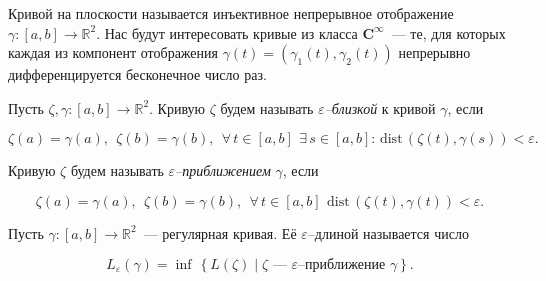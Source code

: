 
\def\dist{\mathrm{dist}\,} \def\ve{\varepsilon}

\noindent Кривой на плоскости называется инъективное непрерывное отображение $\gamma \colon [a,b] \rightarrow {\mathbb R}^2$. Нас будут интересовать кривые из класса $\mathbf C^\infty$~--- те, для которых каждая из компонент отображения $\gamma(t) = (\gamma_1 (t), \gamma_2 (t))$ непрерывно дифференцируется бесконечное число раз.

\medskip\par\noindent Пусть $\zeta, \gamma \colon [a,b] \longrightarrow {\mathbb R}^2$. Кривую $\zeta$ будем называть {\it $\varepsilon$--близкой} к кривой $\gamma$, если

\vspace{-0.2cm}
$$ \zeta(a) = \gamma(a),\ \ \zeta(b) = \gamma(b),\ \ 
\forall\,t \in [a,b]\ \,\exists\,s \in [a,b] \colon
\,\dist(\zeta(t), \gamma(s)) < \varepsilon.$$
\vspace{-0.4cm}

\medskip\par\noindent  Кривую $\zeta$ будем называть {\it $\varepsilon$--приближением} $\gamma$, если

\vspace{-0.2cm}
$$ \zeta(a) = \gamma(a),\ \ \zeta(b) = \gamma(b),\ \ 
\forall\,t \in [a,b]\ \,\dist(\zeta(t), \gamma(t)) < \varepsilon.$$
\vspace{-0.4cm}

\medskip\par\noindent  Пусть $\gamma \colon [a,b] \rightarrow {\mathbb R}^2$~--- регулярная кривая. Её $\varepsilon$--длиной называется число

\vspace{-0.2cm}
$$L_\varepsilon (\gamma) =
\inf \,\left\{
	L(\zeta)  \mid  \text{$\zeta$~--- $\varepsilon$--приближение $\gamma$}
\right\}.$$
\vspace{-0.65cm}

